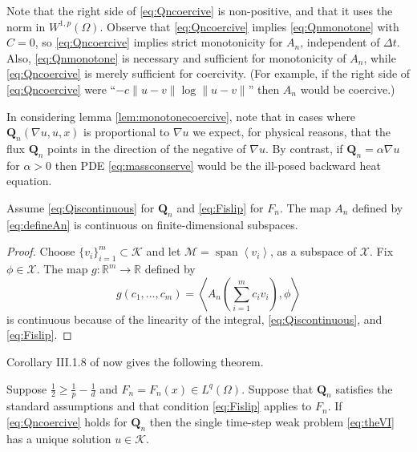 \documentclass[final,leqno,onefignum,onetabnum]{siamltex1213bueler}
\newcommand\bQ{\mathbf{Q}}
\renewcommand{\grad}{\nabla}
\newcommand{\ip}[2]{\ensuremath{\left<#1,#2\right>}}
\newcommand\RR{\mathbb{R}}
\begin{document}
Note that the right side of \eqref{eq:Qncoercive} is non-positive, and that it uses the norm in $W^{1,p}(\Omega)$.  Observe that \eqref{eq:Qncoercive} implies \eqref{eq:Qnmonotone} with $C=0$, so \eqref{eq:Qncoercive} implies strict monotonicity for $A_n$, independent of $\Delta t$.  Also, \eqref{eq:Qnmonotone} is necessary and sufficient for monotonicity of $A_n$, while \eqref{eq:Qncoercive} is merely sufficient for coercivity.  (For example, if the right side of \eqref{eq:Qncoercive} were ``$- c \|u-v\| \log \|u-v\|$'' then $A_n$ would be coercive.)

In considering lemma \ref{lem:monotonecoercive}, note that in cases where $\bQ_n(\grad u,u,x)$ is proportional to $\grad u$ we expect, for physical reasons, that the flux $\bQ_n$ points in the direction of the negative of $\grad u$.  By contrast, if $\bQ_n = \alpha \grad u$ for $\alpha>0$ then PDE \eqref{eq:massconserve} would be the ill-posed backward heat equation.

\medskip
\begin{lemma}  \label{lem:continuous}  Assume \eqref{eq:Qiscontinuous} for $\bQ_n$ and \eqref{eq:Fislip} for $F_n$.  The map $A_n$ defined by \eqref{eq:defineAn} is continuous on finite-dimensional subspaces.
\end{lemma}

\begin{proof} Choose $\{v_i\}_{i=1}^m \subset \mathcal{K}$ and let $\mathcal{M}=\operatorname{span}\left<v_i\right>$, as a subspace of $\mathcal{X}$.  Fix $\phi\in\mathcal{X}$.  The map $g:\RR^m \to \RR$ defined by
\begin{equation}
  g(c_1,\dots,c_m) = \ip{A_n\left(\sum_{i=1}^m c_i v_i\right)}{\phi}
\end{equation}
is continuous because of the linearity of the integral, \eqref{eq:Qiscontinuous}, and \eqref{eq:Fislip}.
\end{proof}

\medskip
Corollary III.1.8 of \cite{KinderlehrerStampacchia1980} now gives the following theorem.

\medskip
\begin{theorem}  \label{thm:monowellposed}  Suppose $\frac{1}{2} \ge \frac{1}{p} - \frac{1}{d}$ and $F_n=F_n(x)\in L^q(\Omega)$.  Suppose that $\bQ_n$ satisfies the standard assumptions and that condition \eqref{eq:Fislip} applies to $F_n$.  If \eqref{eq:Qncoercive} holds for $\bQ_n$ then the single time-step weak problem \eqref{eq:theVI} has a unique solution $u\in\mathcal{K}$.
\end{theorem}
\end{document}
